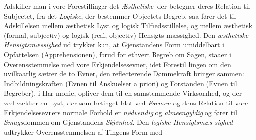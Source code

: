 \documentclass[12pt,a4paper]{book}
\begin{document}
Adskiller man i vore Forestillinger det \emph{Æsthetiske}, der
betegner deres Relation til Subjectet, fra det \emph{Logiske}, der
bestemmer Objectets Begreb, saa fører det til Adskillelsen
mellem æsthetisk Lyst og logisk Tilfredsstillelse, og mellem
æsthetisk (formal, subjectiv) og logisk (real, objectiv) Hensigts\-%
mæssighed. Den \emph{æsthetiske Hensigtsmæssighed} ud\-%
trykker kun, at Gjenstandens Form umiddelbart i Opfattelsen
(Apprehensionen), forud for ethvert Begreb om Sagen, staaer i
Overensstemmelse med vore Erkjendelsesevner, idet Forestil\-%
lingen om den uvilkaarlig sætter de to Evner, den reflecterende
Dømmekraft bringer sammen: Indbildningskraften (Evnen til
Anskuelser a priori) og Forstanden (Evnen til Begreber), i Har\-%
monie, opliver dem til en samstemmende Virksomhed, og der\-%
ved vækker en Lyst, der som betinget blot ved \emph{Formen} og
dens Relation til vore Erkjendelsesevners normale Forhold er
\emph{nødvendig} og \emph{almeengyldig} og fører til \emph{Smags}dommen
om Gjenstandens \emph{Skjønhed}. Den \emph{logiske Hensigtsmæs\-%
sighed} udtrykker Overensstemmelsen af Tingens Form med
\end{document}
